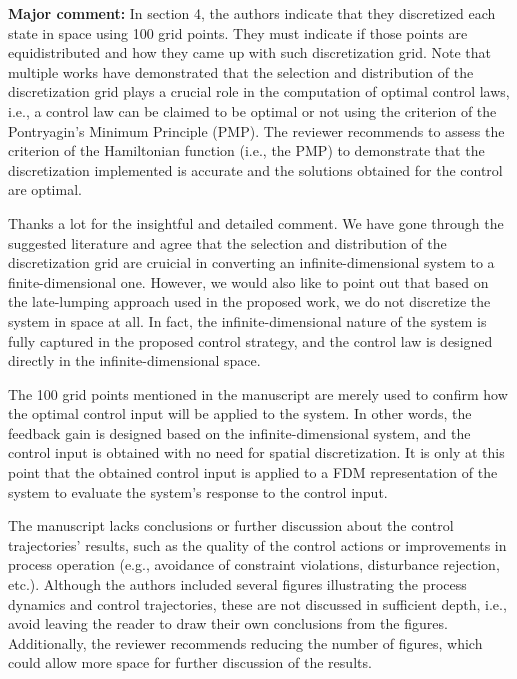 \documentclass[12pt,answers]{exam}
\begin{document}
\begin{questions}

    \question \textbf{Major comment: } In section 4, the authors indicate that they discretized each state in space using 100 grid points. They must indicate if those points are equidistributed and how they came up with such discretization grid. Note that multiple works \cite{palma2023selection, assassa2016optimality, chen2014bilevel} have demonstrated that the selection and distribution of the discretization grid plays a crucial role in the computation of optimal control laws, i.e., a control law can be claimed to be optimal or not using the criterion of the Pontryagin's Minimum Principle (PMP). The reviewer recommends to assess the criterion of the Hamiltonian function (i.e., the PMP) to demonstrate that the discretization implemented is accurate and the solutions obtained for the control are optimal.

    \begin{solutionorbox}
        Thanks a lot for the insightful and detailed comment. We have gone through the suggested literature and agree that the selection and distribution of the discretization grid are cruicial in converting an infinite-dimensional system to a finite-dimensional one. However, we would also like to point out that based on the late-lumping approach used in the proposed work, we do not discretize the system in space at all. In fact, the infinite-dimensional nature of the system is fully captured in the proposed control strategy, and the control law is designed directly in the infinite-dimensional space.

        The 100 grid points mentioned in the manuscript are merely used to confirm how the optimal control input will be applied to the system. In other words, the feedback gain is designed based on the infinite-dimensional system, and the control input is obtained with no need for spatial discretization. It is only at this point that the obtained control input is applied to a FDM representation of the system to evaluate the system's response to the control input.
    \end{solutionorbox}


    \question The manuscript lacks conclusions or further discussion about the control trajectories' results, such as the quality of the control actions or improvements in process operation (e.g., avoidance of constraint violations, disturbance rejection, etc.). Although the authors included several figures illustrating the process dynamics and control trajectories, these are not discussed in sufficient depth, i.e., avoid leaving the reader to draw their own conclusions from the figures. Additionally, the reviewer recommends reducing the number of figures, which could allow more space for further discussion of the results.


\end{questions}
\end{document}
